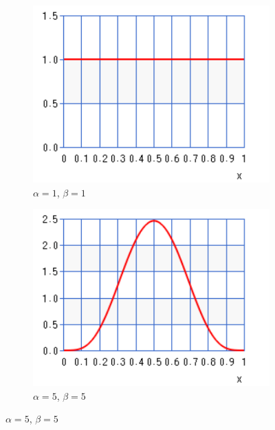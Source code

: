 \begin{figure}[htb]
      \begin{subfigure}{0.49\textwidth}
            \centering
            \includegraphics[width=\textwidth]{images/beta_1_1.pdf}
            \caption{$\alpha=1$, $\beta=1$}
            \label{sec:bhh:hyper_parameters:normalisation_beta_1_1}
      \end{subfigure}
      \begin{subfigure}{0.49\textwidth}
            \centering
            \includegraphics[width=\textwidth]{images/beta_5_5.pdf}
            \caption{$\alpha=5$, $\beta=5$}
            \label{sec:bhh:hyper_parameters:normalisation_beta_5_5}
      \end{subfigure}

\end{figure}
